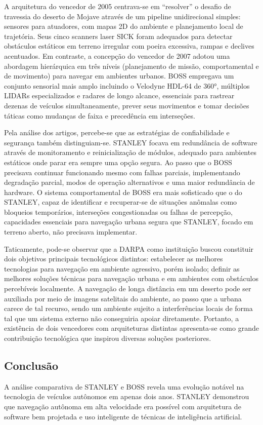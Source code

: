 A arquitetura do vencedor de 2005 centrava-se em ``resolver'' o desafio de travessia do deserto de Mojave através de um pipeline unidirecional simples: sensores para atuadores, com mapas 2D do ambiente e planejamento local de trajetória. Seus cinco scanners laser SICK foram adequados para detectar obstáculos estáticos em terreno irregular com poeira excessiva, rampas e declives acentuados. Em contraste, a concepção do vencedor de 2007 adotou uma abordagem hierárquica em três níveis (planejamento de missão, comportamental e de movimento) para navegar em ambientes urbanos. BOSS empregava um conjunto sensorial mais amplo incluindo o Velodyne HDL-64 de 360°, múltiplos LIDARs especializados e radares de longo alcance, essenciais para rastrear dezenas de veículos simultaneamente, prever seus movimentos e tomar decisões táticas como mudanças de faixa e precedência em interseções.

Pela análise dos artigos, percebe-se que as estratégias de confiabilidade e segurança também distinguiam-se. STANLEY focava em redundância de software através de monitoramento e reinicialização de módulos, adequado para ambientes estáticos onde parar era sempre uma opção segura. Ao passo que o BOSS precisava continuar funcionando mesmo com falhas parciais, implementando degradação parcial, modos de operação alternativos e uma maior redundância de hardware. O sistema comportamental de BOSS era mais sofisticado que o do STANLEY, capaz de identificar e recuperar-se de situações anômalas como bloqueios temporários, interseções congestionadas ou falhas de percepção, capacidades essenciais para navegação urbana segura que STANLEY, focado em terreno aberto, não precisava implementar.

Taticamente, pode-se observar que a DARPA como instituição buscou constituir dois objetivos principais tecnológicos distintos: estabelecer as melhores tecnologias para navegação em ambiente agressivo, porém isolado; definir as melhores soluções técnicas para navegação urbana e em ambientes com obstáculos percebíveis localmente. A navegação de longa distância em um deserto pode ser auxiliada por meio de imagens satelitais do ambiente, ao passo que a urbana carece de tal recurso, sendo um ambiente sujeito a interferências locais de forma tal que um sistema externo não conseguiria apoiar diretamente. Portanto, a existência de dois vencedores com arquiteturas distintas apresenta-se como grande contribuição tecnológica que inspirou diversas soluções posteriores.

\subsection{Conclusão}
A análise comparativa de STANLEY e BOSS revela uma evolução notável na tecnologia de veículos autônomos em apenas dois anos. STANLEY demonstrou que navegação autônoma em alta velocidade era possível com arquitetura de software bem projetada e uso inteligente de técnicas de inteligência artificial. 

